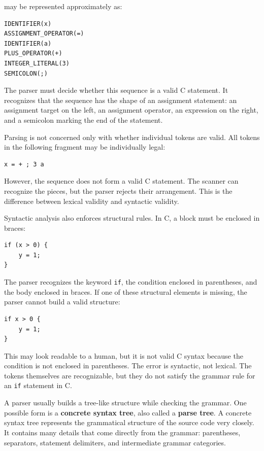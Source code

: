 may be represented approximately as:

\begin{verbatim}
IDENTIFIER(x)
ASSIGNMENT_OPERATOR(=)
IDENTIFIER(a)
PLUS_OPERATOR(+)
INTEGER_LITERAL(3)
SEMICOLON(;)
\end{verbatim}

The parser must decide whether this sequence is a valid C statement. It recognizes that the sequence has the shape of an assignment statement: an assignment target on the left, an assignment operator, an expression on the right, and a semicolon marking the end of the statement.

Parsing is not concerned only with whether individual tokens are valid. All tokens in the following fragment may be individually legal:

\begin{verbatim}
x = + ; 3 a
\end{verbatim}

However, the sequence does not form a valid C statement. The scanner can recognize the pieces, but the parser rejects their arrangement. This is the difference between lexical validity and syntactic validity.

Syntactic analysis also enforces structural rules. In C, a block must be enclosed in braces:

\begin{verbatim}
if (x > 0) {
    y = 1;
}
\end{verbatim}

The parser recognizes the keyword \texttt{if}, the condition enclosed in parentheses, and the body enclosed in braces. If one of these structural elements is missing, the parser cannot build a valid structure:

\begin{verbatim}
if x > 0 {
    y = 1;
}
\end{verbatim}

This may look readable to a human, but it is not valid C syntax because the condition is not enclosed in parentheses. The error is syntactic, not lexical. The tokens themselves are recognizable, but they do not satisfy the grammar rule for an \texttt{if} statement in C.

A parser usually builds a tree-like structure while checking the grammar. One possible form is a \textbf{concrete syntax tree}, also called a \textbf{parse tree}. A concrete syntax tree represents the grammatical structure of the source code very closely. It contains many details that come directly from the grammar: parentheses, separators, statement delimiters, and intermediate grammar categories.


